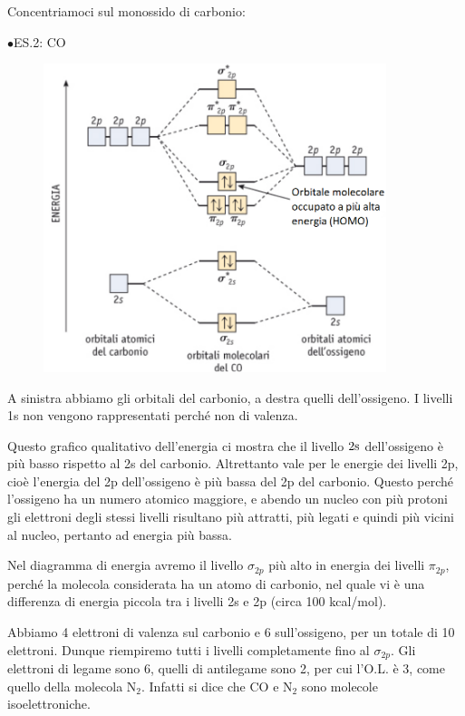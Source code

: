 
Concentriamoci sul monossido di carbonio:

\vspace{0.2cm}$\bullet$ES.2: CO

\begin{figure}[htp]
    \centering
    \includegraphics[width=10cm]{immagini/orbitali_molecolari_CO.png}
\end{figure}

A sinistra abbiamo gli orbitali del carbonio, a destra quelli dell'ossigeno. I livelli 1s non vengono rappresentati perché non di valenza.

Questo grafico qualitativo dell'energia ci mostra che il livello $\rm 2s$ dell'ossigeno è più basso rispetto al 2s del carbonio. Altrettanto vale per le energie dei livelli 2p, cioè l'energia del 2p dell'ossigeno è più bassa del 2p del carbonio. Questo perché l'ossigeno ha un numero atomico maggiore, e abendo un nucleo con più protoni gli elettroni degli stessi livelli risultano più attratti, più legati e quindi più vicini al nucleo, pertanto ad energia più bassa.

Nel diagramma di energia avremo il livello $\sigma_{2p}$ più alto in energia dei livelli $\pi_{2p}$, perché la molecola considerata ha un atomo di carbonio, nel quale vi è una differenza di energia piccola tra i livelli 2s e 2p (circa 100 kcal/mol).

Abbiamo 4 elettroni di valenza sul carbonio e 6 sull'ossigeno, per un totale di 10 elettroni. Dunque riempiremo tutti i livelli completamente fino al $\sigma_{2p}$. Gli elettroni di legame sono 6, quelli di antilegame sono 2, per cui l'O.L. è 3, come quello della molecola N$_2$. Infatti si dice che CO e N$_2$ sono molecole isoelettroniche.



